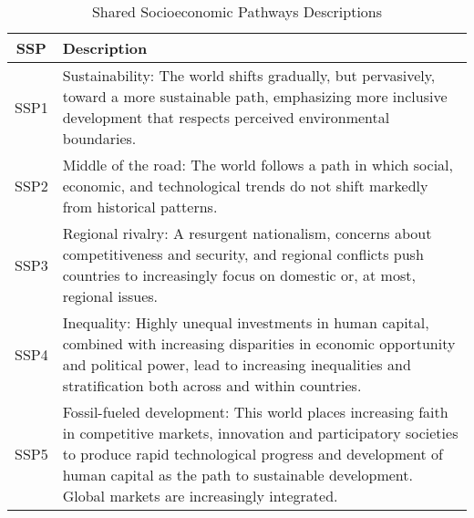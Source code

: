 \documentclass[honours,12pt]{unswthesis}
\numberwithin{equation}{section}
\begin{document}
\begin{table}[h]
    \centering
    \begin{tabularx}{\textwidth}{|c|X|}
        \hline
        \textbf{SSP} & \textbf{Description}                                                                                                                                                                                                                                                                      \\ \hline
        SSP1         & Sustainability: The world shifts gradually, but pervasively, toward a more sustainable path, emphasizing more inclusive development that respects perceived environmental boundaries.                                                                                                     \\ \hline
        SSP2         & Middle of the road: The world follows a path in which social, economic, and technological trends do not shift markedly from historical patterns.                                                                                                                                          \\ \hline
        SSP3         & Regional rivalry: A resurgent nationalism, concerns about competitiveness and security, and regional conflicts push countries to increasingly focus on domestic or, at most, regional issues.                                                                                             \\ \hline
        SSP4         & Inequality: Highly unequal investments in human capital, combined with increasing disparities in economic opportunity and political power, lead to increasing inequalities and stratification both across and within countries.                                                           \\ \hline
        SSP5         & Fossil-fueled development: This world places increasing faith in competitive markets, innovation and participatory societies to produce rapid technological progress and development of human capital as the path to sustainable development. Global markets are increasingly integrated. \\ \hline    
    \end{tabularx}
    \vspace{1pt}
    \caption{Shared Socioeconomic Pathways Descriptions}
\end{table}
\end{document}
